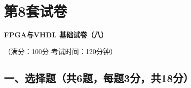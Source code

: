 \chapter{第8套试卷}

\begin{center}
\textbf{FPGA与VHDL 基础试卷（八）}

（满分：100分 \hspace{2em} 考试时间：120分钟）
\end{center}

\section*{一、选择题（共6题，每题3分，共18分）}

